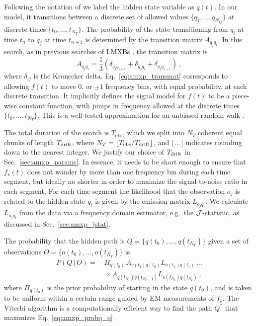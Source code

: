 Following the notation of \citet{o2vitsco, Middleton2020} we label the hidden state variable as $q(t)$. In our model, it transitions between a discrete set of allowed values $\{q_1,...,q_{N_Q}\}$ at discrete times $\{t_0,...,t_{N_T}\}$. The probability of the state transitioning from $q_i$ at time $t_n$ to $q_j$ at time $t_{n+1}$ is determined by the transition matrix $A_{q_j q_i}$. In this search, as in previous searches of LMXBs \cite{o1vitsco, o2vitsco, Middleton2020}, the transition matrix is
\begin{equation}
\label{eq:amxp_transmat}
{A_{q_j q_i} = \frac{1}{3}\left(\delta_{q_j q_{i+1}} + \delta_{q_j q_i} + \delta_{q_j q_{i-1}}\right)}\ ,
\end{equation}
where $\delta_{ij}$ is the Kronecker delta. Eq.~\eqref{eq:amxp_transmat} corresponds to allowing $f(t)$ to move 0, or $\pm1$ frequency bins, with equal probability, at each discrete transition. It implicitly defines the signal model for $f(t)$ to be a piece-wise constant function, with jumps in frequency allowed at the discrete times $\{t_0, ... , t_{N_T}\}$. This is a well-tested approximation for an unbiased random walk \cite{Suvorova2016, Suvorova2017}.

The total duration of the search is $T_\textrm{obs}$, which we split into $N_T$ coherent equal chunks of length $T_{\textrm{drift}}$, where $N_T = \lfloor T_\textrm{obs} / T_{\textrm{drift}} \rfloor$, and $\lfloor ... \rfloor$ indicates rounding down to the nearest integer. We justify our choice of $T_{\textrm{drift}}$ in Sec.~\ref{sec:amxp_params}. In essence, it needs to be short enough to ensure that $f_\star(t)$ does not wander by more than one frequency bin during each time segment, but ideally no shorter in order to maximize the signal-to-noise ratio in each segment. For each time segment the likelihood that the observation $o_j$ is related to the hidden state $q_i$ is given by the emission matrix $L_{o_j q_i}$. We calculate $L_{o_j q_i}$ from the data via a frequency domain estimator, e.g.~the $\mathcal{J}$-statistic, as discussed in Sec.~\ref{sec:amxp_jstat}.

The probability that the hidden path is $Q = \{q(t_0), ..., q(t_{N_T})\}$ given a set of observations $O = \{o(t_0), ..., o(t_{N_T})\}$ is
\begin{align}
\label{eq:amxp_probq_o}
P(Q\,|\,O) =&~ \Pi_{q(t_0)}\, A_{q(t_1) q(t_0)} L_{o(t_1) q(t_1)}\ ... \nonumber\\
&~\times  A_{q(t_{N_T}) q(t_{N_T - 1})} L_{o(t_{N_T}) q(t_{N_T})}\ ,
\end{align}
where $\Pi_{q(t_0)}$ is the prior probability of starting in the state $q(t_0)$, and is taken to be uniform within a certain range guided by EM measurements of $f_\star$. The Viterbi algorithm is a computationally efficient way to find the path $Q^{*}$ that maximizes Eq.~\eqref{eq:amxp_probq_o} \cite{Viterbi1967}. 

